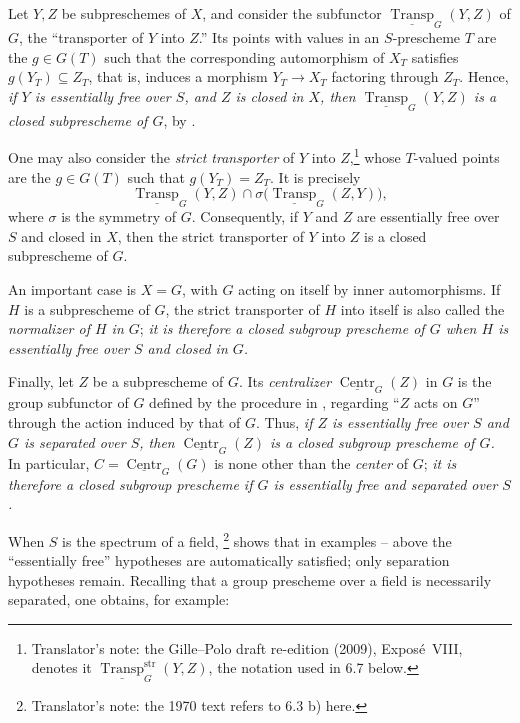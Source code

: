 Let \(Y,Z\) be subpreschemes of \(X\), and consider the subfunctor
\(\underline{\operatorname{Transp}}_G(Y,Z)\) of \(G\), the
``transporter of \(Y\) into \(Z\).'' Its points with values in an
\(S\)-prescheme \(T\) are the \(g\in G(T)\) such that the corresponding
automorphism of \(X_T\) satisfies \(g(Y_T)\subseteq Z_T\), that is,
induces a morphism \(Y_T\to X_T\) factoring through \(Z_T\). Hence,
\textit{if \(Y\) is essentially free over \(S\), and \(Z\) is closed in
\(X\), then \(\underline{\operatorname{Transp}}_G(Y,Z)\) is a closed
subprescheme of \(G\)}, by .

One may also consider the \emph{strict transporter} of \(Y\) into
\(Z\),\footnote{Translator's note: the Gille--Polo draft re-edition (2009), Expos\'e~VIII, denotes
it \(\underline{\operatorname{Transp}}^{\mathrm{str}}_G(Y,Z)\), the notation used in 6.7 below.}
whose \(T\)-valued points are the \(g\in G(T)\) such that
\(g(Y_T)=Z_T\). It is precisely
\[
  \underline{\operatorname{Transp}}_G(Y,Z)
  \cap
  \sigma\bigl(\underline{\operatorname{Transp}}_G(Z,Y)\bigr),
\]
where \(\sigma\) is the symmetry of \(G\). Consequently, if \(Y\) and
\(Z\) are essentially free over \(S\) and closed in \(X\), then the
strict transporter of \(Y\) into \(Z\) is a closed subprescheme of
\(G\).

An important case is \(X=G\), with \(G\) acting on itself by inner
automorphisms. If \(H\) is a subprescheme of \(G\), the strict
transporter of \(H\) into itself is also called the \emph{normalizer of
\(H\) in \(G\)}; \textit{it is therefore a closed subgroup prescheme of
\(G\) when \(H\) is essentially free over \(S\) and closed in \(G\).}

Finally, let \(Z\) be a subprescheme of \(G\). Its \emph{centralizer}
\(\underline{\operatorname{Centr}}_G(Z)\) in \(G\) is the group
subfunctor of \(G\) defined by the procedure in , regarding ``\(Z\)
acts on \(G\)'' through the action induced by that of \(G\). Thus,
\textit{if \(Z\) is essentially free over \(S\) and \(G\) is separated
over \(S\), then \(\underline{\operatorname{Centr}}_G(Z)\) is a closed
subgroup prescheme of \(G\).} In particular,
\(C=\underline{\operatorname{Centr}}_G(G)\) is none other than the
\emph{center} of \(G\); \textit{it is therefore a closed subgroup prescheme if
\(G\) is essentially free and separated over \(S\).}

When \(S\) is the spectrum of a field,
\footnote{Translator's note: the 1970
text refers to 6.3 b) here.} shows that in examples
-- above the ``essentially free'' hypotheses are automatically
satisfied; only separation hypotheses remain. Recalling that a
group prescheme over a field is necessarily separated, one obtains,
for example:

